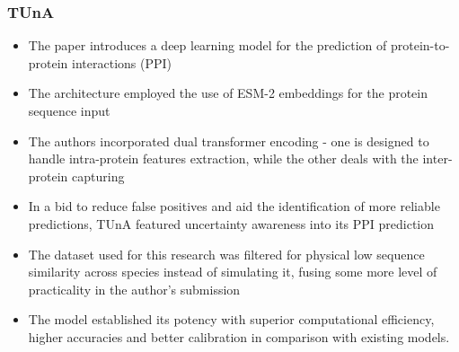 \subsubsection{TUnA}
\begin{itemize}
    \item The paper introduces a deep learning model for the prediction of protein-to-protein interactions (PPI)
    \item The architecture employed the use of ESM-2 embeddings for the protein sequence input
    \item The authors incorporated dual transformer encoding - one is designed to handle intra-protein features extraction, while the other deals with the inter-protein capturing
    \item In a bid to reduce false positives and aid the identification of more reliable predictions, TUnA featured uncertainty awareness into its PPI prediction
    \item The dataset used for this research was filtered for physical low sequence similarity across species instead of simulating it, fusing some more level of practicality in the author's submission
    \item The model established its potency with superior computational efficiency, higher accuracies and better calibration in comparison with existing models.
\end{itemize}